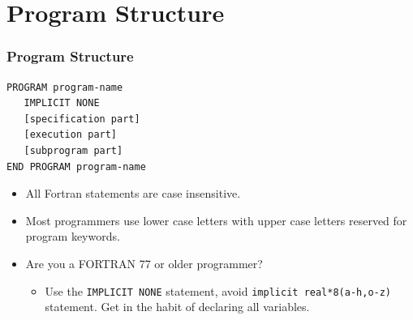 \documentclass[c,mathserif,compress,xcolor=svgnames]{beamer}
\newcommand{\lstfortran}[1]{\lstinline[language={[90]Fortran},basicstyle=\footnotesize\ttfamily]|#1|}
\newenvironment{eblock}[0]
{
\begin{beamerboxesrounded}[upper=uppercol2,lower=lowercol2,shadow=true]}
{\end{beamerboxesrounded}}
\begin{document}
\section{Program Structure}
\begin{frame}
  \frametitle{Program Structure}
    \begin{eblock}{}
      \begin{lstlisting}[language={[90]Fortran}]
PROGRAM program-name
   IMPLICIT NONE
   [specification part]
   [execution part]
   [subprogram part]
END PROGRAM program-name
      \end{lstlisting}
    \end{eblock}
  \begin{itemize}
    \item All Fortran statements are case insensitive.
    \item Most programmers use lower case letters with upper case letters reserved for program keywords.
    \item Are you a FORTRAN 77 or older programmer?
    \begin{itemize}
      \item Use the \lstfortran{IMPLICIT NONE} statement, avoid \lstfortran{implicit real*8(a-h,o-z)} statement. Get in the habit of declaring all variables.
    \end{itemize}
  \end{itemize}
\end{frame}
\end{document}
